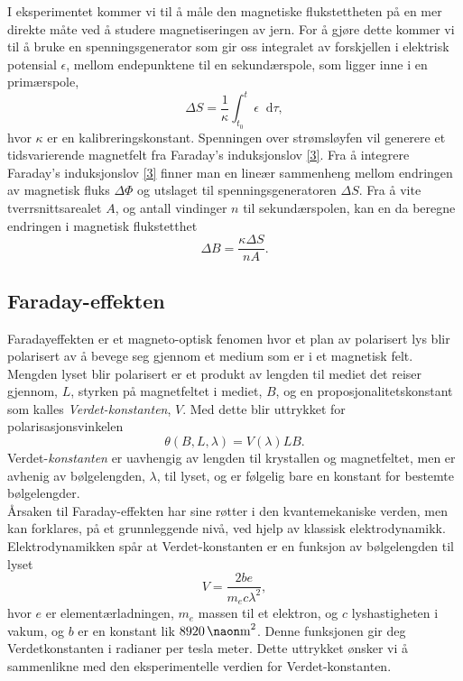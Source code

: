 \documentclass[%
 reprint,
 amsmath,amssymb,
 aps,
 norsk,
]{revtex4-1}
\newcommand*\diff{\mathop{}\!\mathrm{d}}
\begin{document}
\par
I eksperimentet kommer vi til å måle den magnetiske flukstettheten på en mer direkte måte ved å studere magnetiseringen av jern. For å gjøre dette kommer vi til å bruke en spenningsgenerator som gir oss integralet av forskjellen i elektrisk potensial $\epsilon$, mellom endepunktene til en sekundærspole, som ligger inne i en primærspole,
\begin{equation*}
  \Delta S = \frac{1}{\kappa}\int_{t_0}^{t}\epsilon \diff \tau, \label{deltas}
\end{equation*}
hvor $\kappa$ er en kalibreringskonstant. Spenningen over strømsløyfen vil generere et tidsvarierende magnetfelt fra Faraday's induksjonslov \eqref{3}. Fra å integrere Faraday's induksjonslov \eqref{3} finner man en lineær sammenheng mellom endringen av magnetisk fluks $\Delta \Phi$ og utslaget til spenningsgeneratoren $\Delta S$. Fra å vite tverrsnittsarealet $A$, og antall vindinger $n$ til sekundærspolen, kan en da beregne endringen i magnetisk flukstetthet
\begin{equation}
  \Delta B = \frac{\kappa\Delta S}{nA}.\label{deltab}
\end{equation}
\subsection{Faraday-effekten}
Faradayeffekten er et magneto-optisk fenomen hvor et plan av polarisert lys blir polarisert av å bevege seg gjennom et medium som er i et magnetisk felt. Mengden lyset blir polarisert er et produkt av lengden til mediet det reiser gjennom, $L$, styrken på magnetfeltet i mediet, $B$, og en proposjonalitetskonstant som kalles \textit{Verdet-konstanten}, $V$. Med dette blir uttrykket for polarisasjonsvinkelen
\begin{equation}
  \theta\left(B, L, \lambda\right) = V\left(\lambda\right)LB.\label{verdet}
\end{equation}
Verdet-\textit{konstanten} er uavhengig av lengden til krystallen og magnetfeltet, men er avhenig av bølgelengden, $\lambda$, til lyset, og er følgelig bare en konstant for bestemte bølgelengder.\\
Årsaken til Faraday-effekten har sine røtter i den kvantemekaniske verden, men kan forklares, på et grunnleggende nivå, ved hjelp av klassisk elektrodynamikk. Elektrodynamikken spår at Verdet-konstanten er en funksjon av bølgelengden til lyset \cite{pdf_task}
\begin{equation}
  V = \frac{2be}{m_ec\lambda^2}, \label{test_verdu2}
\end{equation}
hvor $e$ er elementærladningen, $m_e$ massen til et elektron, og $c$ lyshastigheten i vakum, og $b$ er en konstant lik $\SI{8920}{\naon\meter^2}$. Denne funksjonen gir deg Verdetkonstanten i radianer per tesla meter. Dette uttrykket ønsker vi å sammenlikne med den eksperimentelle verdien for Verdet-konstanten.
\end{document}

